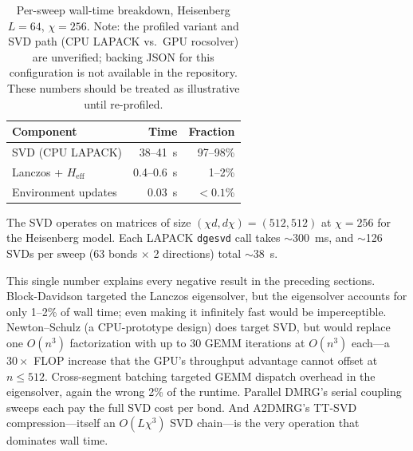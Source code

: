 \documentclass[preprint,12pt]{elsarticle}
\begin{document}
\begin{table}[h]
\centering
\caption{Per-sweep wall-time breakdown, Heisenberg $L = 64$, $\chi = 256$. Note: the profiled variant and SVD path (CPU LAPACK vs.\ GPU rocsolver) are unverified; backing JSON for this configuration is not available in the repository. These numbers should be treated as illustrative until re-profiled.}
\label{tab:profile}
\begin{tabular}{lrr}
\toprule
Component & Time & Fraction \\
\midrule
SVD (CPU LAPACK) & 38--41~s & 97--98\% \\
Lanczos + $H_\text{eff}$ & 0.4--0.6~s & 1--2\% \\
Environment updates & 0.03~s & $< 0.1$\% \\
\bottomrule
\end{tabular}
\end{table}

The SVD operates on matrices of size $(\chi d, d \chi) = (512, 512)$ at $\chi = 256$ for the Heisenberg model.
Each LAPACK \texttt{dgesvd} call takes $\sim$300~ms, and $\sim$126 SVDs per sweep (63 bonds $\times$ 2 directions) total $\sim$38~s.

This single number explains every negative result in the preceding sections.
Block-Davidson targeted the Lanczos eigensolver, but the eigensolver accounts for only 1--2\% of wall time; even making it infinitely fast would be imperceptible.
Newton--Schulz (a CPU-prototype design) does target SVD, but would replace one $O(n^3)$ factorization with up to 30 GEMM iterations at $O(n^3)$ each---a $30\times$ FLOP increase that the GPU's throughput advantage cannot offset at $n \leq 512$.
Cross-segment batching targeted GEMM dispatch overhead in the eigensolver, again the wrong 2\% of the runtime.
Parallel DMRG's serial coupling sweeps each pay the full SVD cost per bond.
And A2DMRG's TT-SVD compression---itself an $O(L \chi^3)$ SVD chain---is the very operation that dominates wall time.
\end{document}
